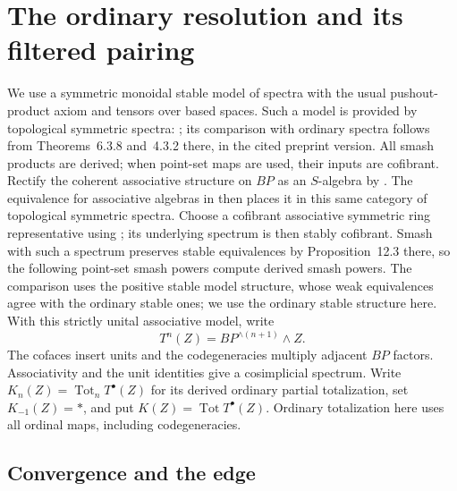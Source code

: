 \section{The ordinary resolution and its filtered pairing}
\label{app:resolution}

We use a symmetric monoidal stable model of spectra with the usual
pushout-product axiom and tensors over based spaces. Such a model is
provided by topological symmetric spectra:
\citet[Section~6.2, Theorems~6.3.8 and~6.4.1, and
Corollary~6.4.2]{HoveyShipleySmith1998v2}; its comparison with ordinary
spectra follows from Theorems~6.3.8 and~4.3.2 there, in the cited
preprint version.
All smash products
are derived; when point-set maps are used, their inputs are cofibrant.
Rectify the coherent associative structure on $BP$ as an $S$-algebra by
\citet[Part~II, Corollary~3.6 and the associative convention comparison
in Section~4]{ElmendorfKrizMandellMay1997}. The equivalence for associative
algebras in \citet[Main Theorem and Theorem~5.1(ii)]{Schwede2001} then
places it in this same category of topological symmetric spectra.
Choose a cofibrant associative symmetric ring representative using
\citet[Theorem~12.1(iv)--(v)]{MandellMaySchwedeShipley2001}; its
underlying spectrum is then stably cofibrant. Smash with such a spectrum
preserves stable equivalences by Proposition~12.3 there, so the following
point-set smash powers compute derived smash powers.
The comparison uses the positive stable model structure, whose weak
equivalences agree with the ordinary stable ones; we use the ordinary
stable structure here. With this strictly unital associative model, write
\[
 T^n(Z)=BP^{\wedge(n+1)}\wedge Z.
\]
The cofaces insert units and the codegeneracies multiply adjacent $BP$
factors.  Associativity and the unit identities give a cosimplicial
spectrum.  Write $K_n(Z)=\operatorname{Tot}_n T^\bullet(Z)$ for its
derived ordinary partial totalization, set $K_{-1}(Z)=*$, and put
$K(Z)=\operatorname{Tot}T^\bullet(Z)$.  Ordinary totalization here uses
all ordinal maps, including codegeneracies.

\subsection{Convergence and the edge}\label{app:convergence}

